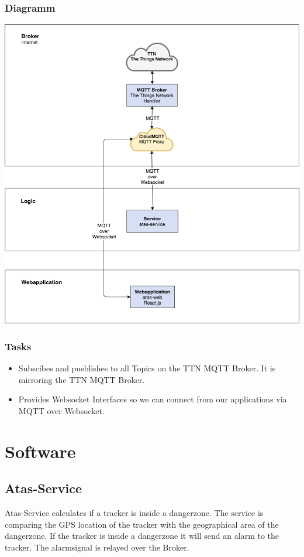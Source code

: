 \documentclass[a4paper,11pt, oneside]{report}
\theoremstyle{definition}
\begin{document}
\subsubsection{Diagramm}
\includegraphics[width=\textwidth]{img/ATAS_SystemOverview_Detail_CloudMQTT.png}

\subsubsection{Tasks}
\begin{itemize}
\item Subscibes and pusblishes to all Topics on the TTN MQTT Broker. It is mirroring the TTN MQTT Broker.
\item Provides Websocket Interfaces so we can connect from our applications via MQTT over Websocket.
\end{itemize}

\newpage
\section{Software}
\subsection{Atas-Service}
Atas-Service calculates if a tracker is inside a dangerzone. The service is comparing the GPS location of the tracker with the geographical area of the dangerzone. If the tracker is inside a dangerzone it will send an alarm to the tracker. The alarmsignal is relayed over the Broker.
\end{document}

